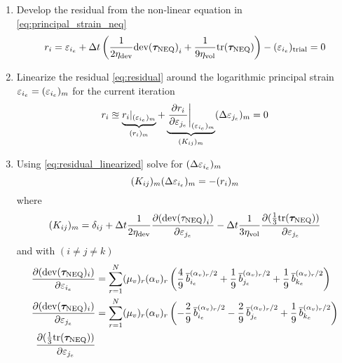 \begin{enumerate}
    \item Develop the residual from the non-linear equation in \cref{eq:principal_strain_neq}
    \begin{equation}
       r_{i} = \varepsilon_{{i}_e} + \Delta t \left( \frac{1}{2\eta_{\text{dev}}} \text{dev}{(\bm{\tau}_{\text{NEQ}})}_{i} + \frac{1}{9\eta_{\text{vol}}} \text{tr}(\bm{\tau}_{\text{NEQ}}) \right) - ({\varepsilon_{{i}_e}})_\text{trial} = 0
       \label{eq:residual}
    \end{equation}
    \item Linearize the residual \cref{eq:residual}  around the logarithmic principal strain \(\varepsilon_{{i}_e} = (\varepsilon_{{i}_e})_{m}\) for the current iteration
    \begin{equation}
        r_{i} 
        \approxeq \underbrace{r_{i}|_{(\varepsilon_{{i}_e})_{m}}}_{(r_{i})_m} 
        + \underbrace{\left. \pdv{r_{i}}{\varepsilon_{{j}_e}} \right|_{(\varepsilon_{{i}_e})_{m}}}_{(K_{ij})_{m}} (\Delta \varepsilon_{{j}_e})_{m} = 0
        \label{eq:residual_linearized}
    \end{equation}
    \item Using \cref{eq:residual_linearized} solve for \((\Delta \varepsilon_{{i}_e})_{m}\)
    \begin{equation} 
        (K_{ij})_{m} (\Delta \varepsilon_{{i}_e})_{m} = -(r_{i})_{m}
        \label{eq:strain_increment_neq}
    \end{equation}
    where 
    \begin{equation}
        (K_{ij})_{m} = \delta_{ij} 
        + \Delta t \frac{1}{2\eta_{\text{dev}}} \pdv{({\text{dev}({\tau}_{\text{NEQ}})}_{i})}{\varepsilon_{{j}_e}} 
        - \Delta t \frac{1}{3\eta_{\text{vol}}} \pdv{(\frac{1}{3}\text{tr}(\bm{\tau}_{\text{NEQ}}))}{\varepsilon_{{j}_e}}
        \label{eq:K_newton_iteration}
    \end{equation}
    and with \(( i \neq j \neq k)\)
    \begin{align}
        \pdv{(\text{dev}(\tauneq)_{i})}{\prstrain{i}} 
        &= \sum_{r=1}^{N}\mumr \amr \left(
             \frac{4}{9} \,\sqprstretchdev{i}^{\amr/2}
            +\frac{1}{9} \,\sqprstretchdev{j}^{\amr/2}
            +\frac{1}{9} \,\sqprstretchdev{k}^{\amr/2} \right)  \label{eq:diff_prtauneqdevi_i}\\
        \pdv{(\text{dev}(\tauneq)_{i})}{\prstrain{j}} 
        &= \sum_{r=1}^{N}\mumr \amr \left(
            -\frac{2}{9} \,\sqprstretchdev{i}^{\amr/2}
            -\frac{2}{9} \,\sqprstretchdev{j}^{\amr/2}
            +\frac{1}{9} \,\sqprstretchdev{k}^{\amr/2} \right)  \label{eq:diff_prtauneqdevi_j}\\
        \pdv{(\frac{1}{3}\text{tr}(\tauneq))}{\prstrain{j}} 

\end{align}
\end{enumerate}
